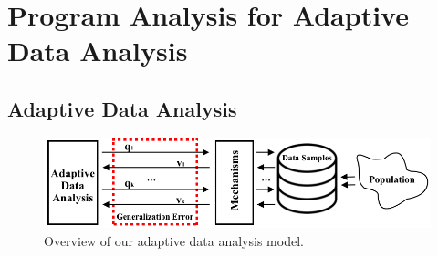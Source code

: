 \chapter{Program Analysis for Adaptive Data Analysis}
\label{ch:adapt_intro}

\section{Adaptive Data Analysis}
\label{sec:adapt-backgroung}

\begin{figure}
    \centering
    \includegraphics[width=0.9\columnwidth]{chapters/adapt/overview-dissertation.png}
    \caption{Overview of our adaptive data analysis model. }
    \label{fig:adaptivity-model-overview}
\vspace{-0.5cm}
\end{figure}

